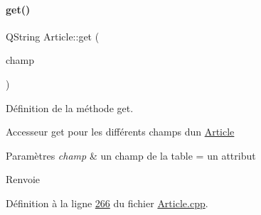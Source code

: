 \paragraph{\texorpdfstring{get()}{get()}}
{\footnotesize\ttfamily Q\+String Article\+::get (\begin{DoxyParamCaption}\item[{\hyperlink{_article_8h_a159354683cfd6e1b578172fbe6490ab6}{Champ\+Article}}]{champ }\end{DoxyParamCaption})}



Définition de la méthode get. 

Accesseur get pour les différents champs d\textquotesingle{}un \hyperlink{class_article}{Article} 
\begin{DoxyParams}{Paramètres}
{\em champ} & un champ de la table = un attribut \\
\hline
\end{DoxyParams}
\begin{DoxyReturn}{Renvoie}

\end{DoxyReturn}


Définition à la ligne \hyperlink{_article_8cpp_source_l00266}{266} du fichier \hyperlink{_article_8cpp_source}{Article.\+cpp}.



